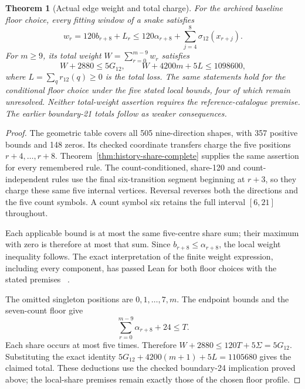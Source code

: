 \documentclass[11pt,a4paper]{article}
\newtheorem{theorem}{Theorem}[section]
\theoremstyle{definition}
\theoremstyle{remark}
\begin{document}
\begin{theorem}[Actual edge weight and total charge]\label{thm:actual-weight-budget}
For the archived baseline floor choice, every fitting window of a snake satisfies
\[
w_r=120b_{r+8}+L_r
\le120\alpha_{r+8}+\sum_{j=4}^{8}\sigma_{12}(x_{r+j}).
\]
For $m\ge9$, its total weight $W=\sum_{r=0}^{m-9}w_r$ satisfies
\[
W+2880\le5G_{12},\qquad W+4200m+5L\le1098600,
\]
where $L=\sum_qr_{12}(q)\ge0$ is the total loss.
The same statements hold for the conditional floor choice under the five
stated local bounds, four of which remain unresolved. Neither total-weight assertion requires
the reference-catalogue premise. The earlier boundary-21 totals follow
as weaker consequences.
\end{theorem}
\begin{proof}
The geometric table covers all 505 nine-direction shapes, with 357 positive
bounds and 148 zeros. Its checked coordinate transfers charge the five
positions $r+4,\ldots,r+8$. Theorem~\ref{thm:history-share-complete} supplies
the same assertion for every remembered rule. The count-conditioned,
share-120 and count-independent rules use the final six-transition segment
beginning at $r+3$, so they charge these same five internal vertices.
Reversal reverses both the directions and the five count symbols. A count
symbol six retains the full interval $[6,21]$ throughout.

Each applicable bound is at most the same five-centre share sum; their
maximum with zero is therefore at most that sum. Since
$b_{r+8}\le\alpha_{r+8}$, the local weight inequality follows. The exact
interpretation of the finite weight expression, including every component,
has passed Lean for both floor choices with the stated premises
~\cite{weightintegrationarchive}.

The omitted singleton positions are $0,1,\ldots,7,m$. The endpoint
bounds and the seven-count floor give
\[
\sum_{r=0}^{m-9}\alpha_{r+8}+24\le T.
\]
Each share occurs at most five times. Therefore
$W+2880\le120T+5\Sigma=5G_{12}$. Substituting the exact identity
$5G_{12}+4200(m+1)+5L=1105680$ gives the claimed total.
These deductions use the checked boundary-24 implication proved above;
the local-share premises remain exactly those of the chosen floor profile.
\end{proof}
\end{document}
